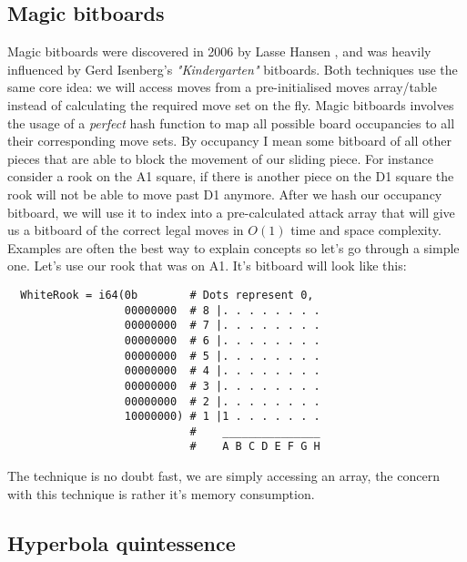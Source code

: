 \subsection*{Magic bitboards}
Magic bitboards were discovered in 2006 by Lasse Hansen
\cite{lasse}, and was heavily influenced by Gerd Isenberg's
\textit{"Kindergarten"} bitboards. Both techniques use the
same core idea: we will access moves from a pre-initialised
moves array/table instead of calculating the required move
set on the fly. Magic bitboards involves the usage of a 
\textit{perfect} hash function to map all possible board
occupancies to all their corresponding move sets. By 
occupancy I mean some bitboard of all other pieces that
are able to block the movement of our sliding piece. For 
instance consider a rook on the A1 square, if there is 
another piece on the D1 square the rook will not be able to 
move past D1 anymore. After we hash our occupancy bitboard,
we will use it to index into a pre-calculated attack array
that will give us a bitboard of the correct legal moves in 
$O(1)$ time and space complexity. Examples are often the 
best way to explain concepts so let's go through a simple one.
Let's use our rook that was on A1. It's bitboard will look 
like this:

\newpage
\begin{verbatim}
  WhiteRook = i64(0b        # Dots represent 0,
                  00000000  # 8 |. . . . . . . .
                  00000000  # 7 |. . . . . . . .
                  00000000  # 6 |. . . . . . . .
                  00000000  # 5 |. . . . . . . .
                  00000000  # 4 |. . . . . . . .
                  00000000  # 3 |. . . . . . . .
                  00000000  # 2 |. . . . . . . .
                  10000000) # 1 |1 . . . . . . .
                            #    _______________
                            #    A B C D E F G H
\end{verbatim}

The technique is no doubt fast, we are simply accessing
an array, the concern with this technique is rather it's
memory consumption.

\subsection*{Hyperbola quintessence}
